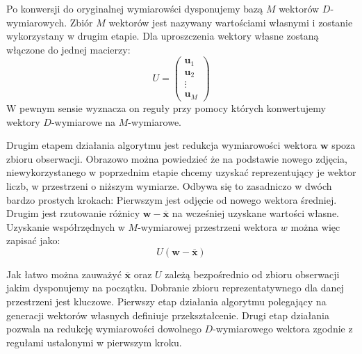 \documentclass{article}
\newcommand{\bb}{\textbf}
\begin{document}
Po konwersji do oryginalnej wymiarowści dysponujemy bazą $M$ wektorów $D$-wymiarowych. Zbiór $M$ wektorów jest nazywany wartościami własnymi i zostanie wykorzystany w drugim etapie. Dla uproszczenia wektory własne zostaną włączone do jednej macierzy:
\begin{equation}
	U = 
	\left( \begin{array}{l}
		\bb{u}_1 \\
		\bb{u}_2 \\
		\vdots	 \\
		\bb{u}_M
	\end{array} \right)
\end{equation}
W pewnym sensie wyznacza on reguły przy pomocy których konwertujemy wektory $D$-wymiarowe na $M$-wymiarowe.

Drugim etapem działania algorytmu jest redukcja wymiarowości wektora $\bb{w}$ spoza zbioru obserwacji. Obrazowo można powiedzieć że na podstawie nowego zdjęcia, niewykorzystanego w poprzednim etapie chcemy uzyskać reprezentujący je wektor liczb, w przestrzeni o niższym wymiarze. Odbywa się to zasadniczo w dwóch bardzo prostych krokach: Pierwszym jest odjęcie od nowego wektora średniej. Drugim jest rzutowanie różnicy $\bb{w} - \overline{\bb{x}}$ na wcześniej uzyskane wartości własne. Uzyskanie współrzędnych w $M$-wymiarowej przestrzeni wektora $w$ można więc zapisać jako:
\begin{equation}
	U ( \bb{w} - \overline{\bb{x}} ) 
\end{equation}

Jak łatwo można zauważyć $\overline{\bb{x}}$ oraz $U$ zależą bezpośrednio od zbioru obserwacji jakim dysponujemy na początku. Dobranie zbioru reprezentatywnego dla danej przestrzeni jest kluczowe. Pierwszy etap działania algorytmu polegający na generacji wektorów własnych definiuje przekształcenie. Drugi etap działania pozwala na redukcję wymiarowości dowolnego $D$-wymiarowego wektora zgodnie z regułami ustalonymi w pierwszym kroku.
\end{document}
